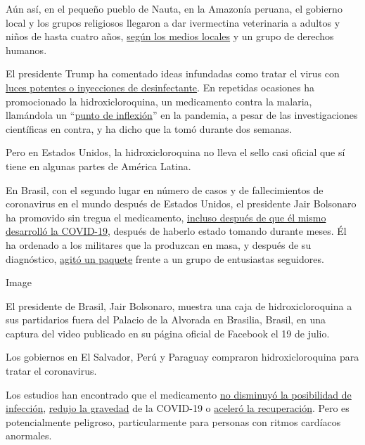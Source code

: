 Aún así, en el pequeño pueblo de Nauta, en la Amazonía peruana, el
gobierno local y los grupos religiosos llegaron a dar ivermectina
veterinaria a adultos y niños de hasta cuatro años,
\href{https://www.youtube.com/watch?v=b7d6ICDRbzo\&feature=youtu.be\&fbclid=IwAR2AxONvP6C8FWbkRAtQRgA-iC4wQm4DNutT1RbaRnk0kf9hivTQx8Fgmm0}{según
los medios locales} y un grupo de derechos humanos.

El presidente Trump ha comentado ideas infundadas como tratar el virus
con
\href{https://www.nytimes3xbfgragh.onion/2020/04/24/health/sunlight-coronavirus-trump.html}{luces
potentes o inyecciones de desinfectante}. En repetidas ocasiones ha
promocionado la hidroxicloroquina, un medicamento contra la malaria,
llamándola un
``\href{https://www.nytimes3xbfgragh.onion/2020/04/17/health/trump-hydroxychloroquine-coronavirus.html}{punto
de inflexión}'' en la pandemia, a pesar de las investigaciones
científicas en contra, y ha dicho que la tomó durante dos semanas.

Pero en Estados Unidos, la hidroxicloroquina no lleva el sello casi
oficial que sí tiene en algunas partes de América Latina.

En Brasil, con el segundo lugar en número de casos y de fallecimientos
de coronavirus en el mundo después de Estados Unidos, el presidente Jair
Bolsonaro ha promovido sin tregua el medicamento,
\href{https://www.nytimes3xbfgragh.onion/2020/07/08/world/americas/brazil-bolsonaro-covid-coronavirus.html}{incluso
después de que él mismo desarrolló la COVID-19}, después de haberlo
estado tomando durante meses. Él ha ordenado a los militares que la
produzcan en masa, y después de su diagnóstico,
\href{https://twitter.com/SamPancher/status/1284974259698380801?s=19}{agitó
un paquete} frente a un grupo de entusiastas seguidores.

Image

El presidente de Brasil, Jair Bolsonaro, muestra una caja de
hidroxicloroquina a sus partidarios fuera del Palacio de la Alvorada en
Brasilia, Brasil, en una captura del video publicado en su página
oficial de Facebook el 19 de julio.

Los gobiernos en El Salvador, Perú y Paraguay compraron
hidroxicloroquina para tratar el coronavirus.

Los estudios han encontrado que el medicamento
\href{https://www.nytimes3xbfgragh.onion/2020/06/03/health/hydroxychloroquine-coronavirus-trump.html}{no
disminuyó la posibilidad de infección},
\href{https://www.acpjournals.org/doi/10.7326/M20-4207}{redujo la
gravedad} de la COVID-19 o
\href{https://www.recoverytrial.net/news/statement-from-the-chief-investigators-of-the-randomised-evaluation-of-covid-19-therapy-recovery-trial-on-hydroxychloroquine-5-june-2020-no-clinical-benefit-from-use-of-hydroxychloroquine-in-hospitalised-patients-with-covid-19}{aceleró
la recuperación}. Pero es potencialmente peligroso, particularmente para
personas con ritmos cardíacos anormales.

